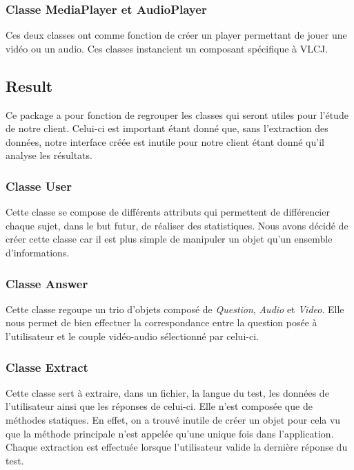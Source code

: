\subsubsection{Classe MediaPlayer et AudioPlayer}\label{players}

Ces deux classes ont comme fonction de créer un player permettant de jouer une vidéo ou un audio. Ces classes instancient un composant spécifique à VLCJ. 

\subsection{Result}\label{Archi_Results}

Ce package a pour fonction de regrouper les classes qui seront utiles pour l'étude de notre client. Celui-ci est important étant donné que, sans l'extraction des données, notre interface créée est inutile pour notre client étant donné qu'il analyse les résultats.

\subsubsection{Classe User}

Cette classe se compose de différents attributs qui permettent de différencier chaque sujet, dans le but futur, de réaliser des statistiques. Nous avons décidé de créer cette classe car il est plus simple de manipuler un objet qu'un ensemble d'informations.

\subsubsection{Classe Answer}

Cette classe regoupe un trio d'objets composé de \textit{Question}, \textit{Audio} et \textit{Video}. Elle nous permet de bien effectuer la correspondance entre la question posée à l'utilisateur et le couple vidéo-audio sélectionné par celui-ci.

\subsubsection{Classe Extract}

Cette classe sert à extraire, dans un fichier, la langue du test, les données de l'utilisateur ainsi que les réponses de celui-ci. Elle n'est composée que de méthodes statiques. En effet, on a trouvé inutile de créer un objet pour cela vu que la méthode principale n'est appelée qu'une unique fois dans l'application. Chaque extraction est effectuée lorsque l'utilisateur valide la dernière réponse du test.

